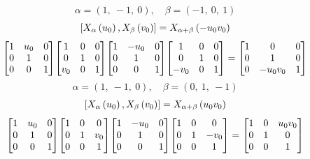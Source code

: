 \documentclass[11pt]{article}
\theoremstyle{definition}
\begin{document}
\[
\alpha = \left( 1, \  -1, \  0\right), \quad \beta = \left( -1, \  0, \  1\right)
\]
\[
\scaletoalign{\textwidth}{\left[ X_{\alpha}\left(u_{0}\right), X_{\beta}\left(v_{0}\right) \right] = X_{\alpha + \beta}\left(- u_{0} v_{0}\right)}
\]
\[
\scaletoalign{\textwidth}{{\left[\begin{matrix}1 & u_{0} & 0\\0 & 1 & 0\\0 & 0 & 1\end{matrix}\right]} {\left[\begin{matrix}1 & 0 & 0\\0 & 1 & 0\\v_{0} & 0 & 1\end{matrix}\right]} {\left[\begin{matrix}1 & - u_{0} & 0\\0 & 1 & 0\\0 & 0 & 1\end{matrix}\right]} {\left[\begin{matrix}1 & 0 & 0\\0 & 1 & 0\\- v_{0} & 0 & 1\end{matrix}\right]} = {\left[\begin{matrix}1 & 0 & 0\\0 & 1 & 0\\0 & - u_{0} v_{0} & 1\end{matrix}\right]}}
\]
\[
\alpha = \left( 1, \  -1, \  0\right), \quad \beta = \left( 0, \  1, \  -1\right)
\]
\[
\scaletoalign{\textwidth}{\left[ X_{\alpha}\left(u_{0}\right), X_{\beta}\left(v_{0}\right) \right] = X_{\alpha + \beta}\left(u_{0} v_{0}\right)}
\]
\[
\scaletoalign{\textwidth}{{\left[\begin{matrix}1 & u_{0} & 0\\0 & 1 & 0\\0 & 0 & 1\end{matrix}\right]} {\left[\begin{matrix}1 & 0 & 0\\0 & 1 & v_{0}\\0 & 0 & 1\end{matrix}\right]} {\left[\begin{matrix}1 & - u_{0} & 0\\0 & 1 & 0\\0 & 0 & 1\end{matrix}\right]} {\left[\begin{matrix}1 & 0 & 0\\0 & 1 & - v_{0}\\0 & 0 & 1\end{matrix}\right]} = {\left[\begin{matrix}1 & 0 & u_{0} v_{0}\\0 & 1 & 0\\0 & 0 & 1\end{matrix}\right]}}
\]
\end{document}
